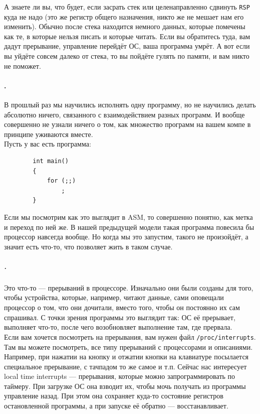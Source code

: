 \documentclass{article}
\newcommand{\asm}[1]{\texttt{#1}}
\begin{document}
    А знаете ли вы, что будет, если засрать стек или целенаправленно сдвинуть \asm{RSP} куда не надо (это же регистр общего назначения, никто же не мешает нам его изменить). Обычно после стека находится немного данных, которые помечены как те, в которые нельзя писать и которые читать. Если вы обратитесь туда, вам дадут прерывание, управление перейдёт ОС, ваша программа умрёт. А вот если вы уйдёте совсем далеко от стека, то вы пойдёте гулять по памяти, и вам никто не поможет.
    \paragraph{.}
    В прошлый раз мы научились исполнять одну программу, но не научились делать абсолютно ничего, связанного с взаимодействием разных программ. И вообще совершенно не узнали ничего о том, как множество программ на вашем компе в принципе уживаются вместе.\\
    Пусть у вас есть программа:
    \begin{verbatim}
        int main()
        {
            for (;;)
                ;
        }
    \end{verbatim}
    Если мы посмотрим как это выглядит в ASM, то совершенно понятно, как метка и переход по ней же. В нашей предыдущей модели такая программа повесила бы процессор навсегда вообще. Но когда мы это запустим, такого не произойдёт, а значит есть что-то, что позволяет жить в таком случае.
    \subparagraph{.}
    Это что-то --- прерываний в процессоре. Изначально они были созданы для того, чтобы устройства, которые, например, читают данные, сами оповещали процессор о том, что они дочитали, вместо того, чтобы он постоянно их сам спрашивал. С точки зрения программы это выглядит так: ОС её прерывает, выполняет что-то, после чего возобновляет выполнение там, где прервала.\\
    Если вам хочется посмотреть на прерывания, вам нужен файл \verb|/proc/interrupts|. Там вы можете посмотреть, все типу прерываний с процессорами и описаниями. Например, при нажатии на кнопку и отжатии кнопки на клавиатуре посылается специальное прерывание, с тачпадом то же самое и т.п. Сейчас нас интересует local time interrupts --- прерывания, которые можно запрограммировать по таймеру. При загрузке ОС она взводит их, чтобы мочь получать из программы управление назад. При этом она сохраняет куда-то состояние регистров остановленной программы, а при запуске её обратно --- восстанавливает.\\
\end{document}

